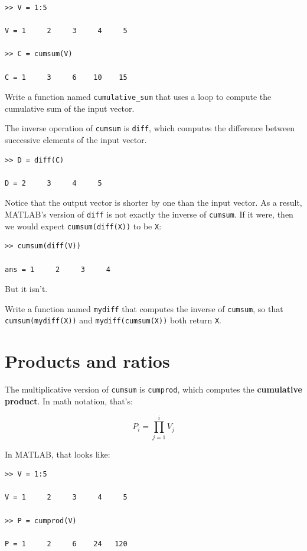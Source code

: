 \documentclass{book}
\begin{document}
\begin{verbatim}
>> V = 1:5

V = 1     2     3     4     5

>> C = cumsum(V)

C = 1     3     6    10    15
\end{verbatim}

\begin{ex}
Write a function named {\tt cumulative\_sum} that uses
a loop to compute the cumulative sum of the input vector.
\end{ex}

The inverse operation of {\tt cumsum} is {\tt diff}, which computes
the difference between successive elements of the input vector.

\begin{verbatim}
>> D = diff(C)

D = 2     3     4     5
\end{verbatim}

Notice that the output vector is shorter by one than the input
vector.  As a result, MATLAB's version of {\tt diff} is not
exactly the inverse of {\tt cumsum}.  If it were, then we would
expect {\tt cumsum(diff(X))} to be {\tt X}:

\begin{verbatim}
>> cumsum(diff(V))

ans = 1     2     3     4
\end{verbatim}

But it isn't.

\begin{ex}
Write a function named {\tt mydiff} that computes the
inverse of {\tt cumsum}, so that {\tt cumsum(mydiff(X))} and
{\tt mydiff(cumsum(X))} both
return {\tt X}.
\end{ex}


\section{Products and ratios}

The multiplicative version of {\tt cumsum} is {\tt cumprod},
which computes the {\bf cumulative product}.  In math notation,
that's:

\begin{equation}
P_i = \prod_{j=1}^i V_j
\end{equation}

In MATLAB, that looks like:

\begin{verbatim}
>> V = 1:5

V = 1     2     3     4     5

>> P = cumprod(V)

P = 1     2     6    24   120
\end{verbatim}
\end{document}
